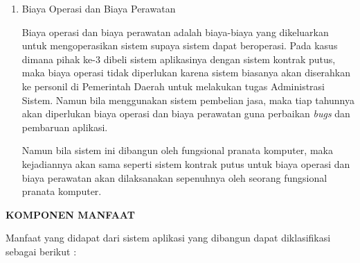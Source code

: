 \documentclass[pdftex, 12pt, oneside]{article}
\begin{document}
\begin{enumerate}[1.]
  \item Biaya Operasi dan Biaya Perawatan
  
  Biaya operasi dan biaya perawatan adalah biaya-biaya yang dikeluarkan untuk mengoperasikan sistem supaya sistem dapat beroperasi. Pada kasus dimana pihak ke-3 dibeli sistem aplikasinya dengan sistem kontrak putus, maka biaya operasi tidak diperlukan karena sistem biasanya akan diserahkan ke personil di Pemerintah Daerah untuk melakukan tugas Administrasi Sistem. Namun bila menggunakan sistem pembelian jasa, maka tiap tahunnya akan diperlukan biaya operasi dan biaya perawatan guna perbaikan \textit{bugs} dan pembaruan aplikasi.
  
  Namun bila sistem ini dibangun oleh fungsional pranata komputer, maka kejadiannya akan sama seperti sistem kontrak putus untuk biaya operasi dan biaya perawatan akan dilaksanakan sepenuhnya oleh seorang fungsional pranata komputer.
  
\end{enumerate}

\textbf{KOMPONEN MANFAAT}

Manfaat yang didapat dari sistem aplikasi yang dibangun dapat diklasifikasi sebagai berikut :
\end{document}
